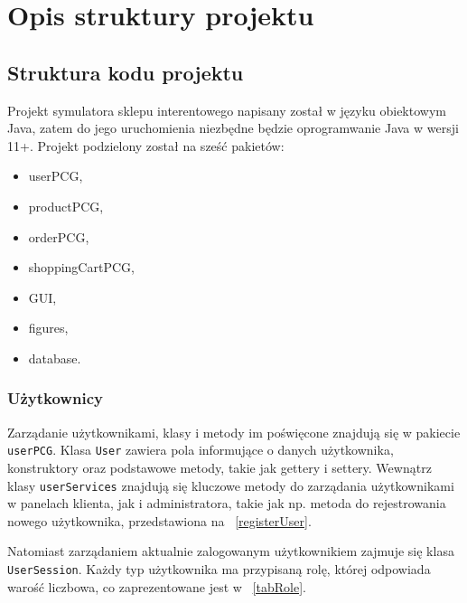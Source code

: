 \chapter{Opis struktury projektu}
\label{cha:struktura}


\section{Struktura kodu projektu}

Projekt symulatora sklepu interentowego napisany został w języku obiektowym Java, zatem do jego uruchomienia niezbędne będzie oprogramwanie Java w wersji 11+. 
Projekt podzielony został na sześć pakietów:
\begin{itemize}
    \item	userPCG,
    \item	productPCG,
    \item	orderPCG,
    \item   shoppingCartPCG,
    \item   GUI,
    \item   figures,
    \item   database.
\end{itemize}


\subsection{Użytkownicy}

Zarządanie użytkownikami, klasy i metody im poświęcone znajdują się w pakiecie \texttt{userPCG}. Klasa \texttt{User} zawiera pola informujące o danych użytkownika,
konstruktory oraz podstawowe metody, takie jak gettery i settery. Wewnątrz klasy \texttt{userServices} znajdują się kluczowe metody do zarządania użytkownikami w panelach klienta, jak i administratora, takie 
jak np. metoda do rejestrowania nowego użytkownika, przedstawiona na \listingname~\ref{registerUser}.



Natomiast zarządaniem aktualnie zalogowanym użytkownikiem zajmuje się klasa \texttt{UserSession}.
Każdy typ użytkownika ma przypisaną rolę, której odpowiada warość liczbowa, co zaprezentowane jest w \tablename~\ref{tabRole}.

